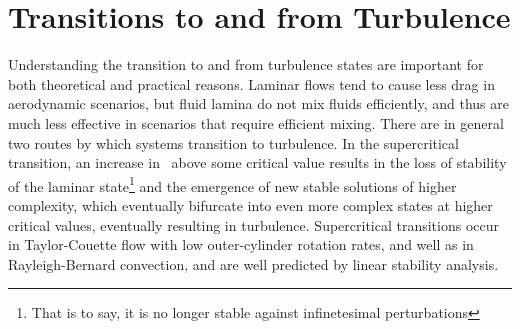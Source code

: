 \section{Transitions to and from Turbulence}

Understanding the transition to and from turbulence states are important for both theoretical and practical reasons. Laminar flows tend to cause less drag in aerodynamic scenarios, but fluid lamina do not mix fluids efficiently, and thus are much less effective in scenarios that require efficient mixing. There are in general two routes by which systems transition to turbulence. In the supercritical transition, an increase in \ReN~above some critical value results in the loss of stability of the laminar state\footnote{That is to say, it is no longer stable against infinetesimal perturbations} and the emergence of new stable solutions of higher complexity, which eventually bifurcate into even more complex states at higher critical values, eventually resulting in turbulence. Supercritical transitions occur in Taylor-Couette flow with low outer-cylinder rotation rates, and well as in Rayleigh-Bernard convection, and are well predicted by linear stability analysis. \\

